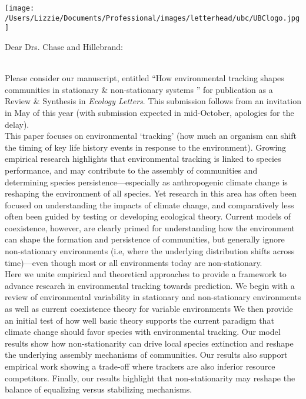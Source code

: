 \documentclass[12pt,a4paper]{letter}
\begin{document}
\begin{letter}{}
\texttt{[image: /Users/Lizzie/Documents/Professional/images/letterhead/ubc/UBClogo.jpg]}
\opening{Dear Drs. Chase and Hillebrand:}
\vspace{1.5ex}\\
Please consider our manuscript, entitled ``How environmental tracking shapes communities in stationary \& non-stationary systems '' for publication as a Review \& Synthesis in \emph{Ecology Letters}. This submission follows from an invitation in May of this year (with submission expected in mid-October, apologies for the delay). 
\vspace{1.5ex}\\
This paper focuses on environmental `tracking' (how much an organism can shift the timing of key life history events in response to the environment). Growing empirical research highlights that environmental tracking is linked to species performance, and may contribute to the assembly of communities and determining species persistence---especially as anthropogenic climate change is reshaping the environment of all species. Yet research in this area has often been focused on understanding the impacts of climate change, and comparatively less often been guided by testing or developing ecological theory. Current models of coexistence, however, are clearly primed for understanding how the environment can shape the formation and persistence of communities, but generally ignore non-stationary environments (i.e, where the underlying distribution shifts across time)---even though most or all environments today are non-stationary. 
\vspace{1.5ex}\\
Here we unite empirical and theoretical approaches to provide a framework to advance research in environmental tracking towards prediction. We begin with a review of environmental variability in stationary and non-stationary environments as well as current coexistence theory for variable environments We then provide an initial test of how well basic theory supports the current paradigm that climate change should favor species with environmental tracking. Our model results show how non-stationarity can drive local species extinction and reshape the underlying assembly mechanisms of communities. Our results also support empirical work showing a trade-off where trackers are also inferior resource competitors. Finally, our results highlight that non-stationarity may reshape the balance of equalizing versus stabilizing mechanisms. 

\end{letter}
\end{document}
